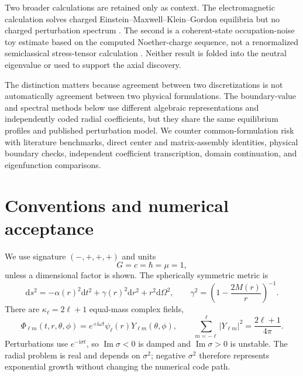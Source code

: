 \documentclass[aps,prd,preprint,onecolumn,nofootinbib,superscriptaddress,showkeys]{revtex4-2}
\newcommand{\dd}{\mathrm{d}}
\newcommand{\ii}{\mathrm{i}}
\newcommand{\sigmatwo}{\sigma^{2}}
\begin{document}
Two broader calculations are retained only as context.  The electromagnetic calculation solves charged Einstein--Maxwell--Klein--Gordon equilibria but no charged perturbation spectrum \cite{JetzerVanDerBij1989,JetzerChargedStability1989,Pugliese2013,LopezAlcubierre2023}.  The second is a coherent-state occupation-noise toy estimate based on the computed Noether-charge sequence, not a renormalized semiclassical stress-tensor calculation \cite{AlcubierreSemiclassical2023,Glauber1963}.  Neither result is folded into the neutral eigenvalue or used to support the axial discovery.

The distinction matters because agreement between two discretizations is not automatically agreement between two physical formulations. The boundary-value and spectral methods below use different algebraic representations and independently coded radial coefficients, but they share the same equilibrium profiles and published perturbation model. We counter common-formulation risk with literature benchmarks, direct center and matrix-assembly identities, physical boundary checks, independent coefficient transcription, domain continuation, and eigenfunction comparisons.

\section{Conventions and numerical acceptance}\label{sec:conventions}

We use signature $(-,+,+,+)$ and units
\begin{equation}
G=c=\hbar=\mu=1,
\end{equation}
unless a dimensional factor is shown. The spherically symmetric metric is
\begin{equation}
\dd s^{2}=-\alpha(r)^{2}\dd t^{2}+\gamma(r)^{2}\dd r^{2}+r^{2}\dd\Omega^{2},
\qquad
\gamma^{2}=\left(1-\frac{2M(r)}{r}\right)^{-1}.
\label{eq:metric}
\end{equation}
There are $\kappa_{\ell}=2\ell+1$ equal-mass complex fields,
\begin{equation}
\Phi_{\ell m}(t,r,\theta,\phi)=e^{+\ii\omega t}\psi_{\ell}(r)Y_{\ell m}(\theta,\phi),
\qquad
\sum_{m=-\ell}^{\ell}|Y_{\ell m}|^{2}=\frac{2\ell+1}{4\pi}.
\end{equation}
Perturbations use $e^{-\ii\sigma t}$, so $\operatorname{Im}\sigma<0$ is damped and $\operatorname{Im}\sigma>0$ is unstable. The radial problem is real and depends on $\sigmatwo$; negative $\sigmatwo$ therefore represents exponential growth without changing the numerical code path.
\end{document}
